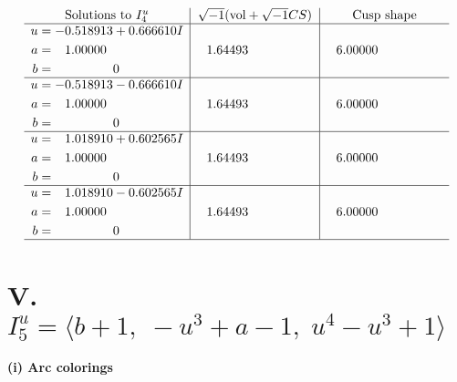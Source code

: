 \documentclass[1p]{elsarticle_modified}
\theoremstyle{definition}
\newcommand{\I}{\sqrt{-1}}
\begin{document}
$$\begin{array}{c|c|c}  
\text{Solutions to }I^u_{4}& \I (\text{vol} + \sqrt{-1}CS) & \text{Cusp shape}\\
 \hline 
\begin{aligned}
u &= -0.518913 + 0.666610 I \\
a &= \phantom{-}1.00000\phantom{ +0.000000I} \\
b &= \phantom{-0.000000 } 0\end{aligned}
 & \phantom{-}1.64493\phantom{ +0.000000I} & \phantom{-}6.00000\phantom{ +0.000000I} \\ \hline\begin{aligned}
u &= -0.518913 - 0.666610 I \\
a &= \phantom{-}1.00000\phantom{ +0.000000I} \\
b &= \phantom{-0.000000 } 0\end{aligned}
 & \phantom{-}1.64493\phantom{ +0.000000I} & \phantom{-}6.00000\phantom{ +0.000000I} \\ \hline\begin{aligned}
u &= \phantom{-}1.018910 + 0.602565 I \\
a &= \phantom{-}1.00000\phantom{ +0.000000I} \\
b &= \phantom{-0.000000 } 0\end{aligned}
 & \phantom{-}1.64493\phantom{ +0.000000I} & \phantom{-}6.00000\phantom{ +0.000000I} \\ \hline\begin{aligned}
u &= \phantom{-}1.018910 - 0.602565 I \\
a &= \phantom{-}1.00000\phantom{ +0.000000I} \\
b &= \phantom{-0.000000 } 0\end{aligned}
 & \phantom{-}1.64493\phantom{ +0.000000I} & \phantom{-}6.00000\phantom{ +0.000000I}\\
 \hline 
 \end{array}$$\newpage\newpage\renewcommand{\arraystretch}{1}
\centering \section*{V. $I^u_{5}= \langle b+1,\;- u^3+a-1,\;u^4- u^3+1 \rangle$}
\flushleft \textbf{(i) Arc colorings}\\
\end{document}
